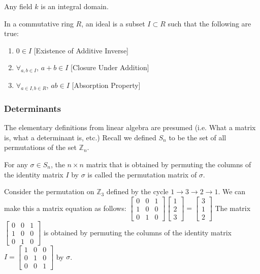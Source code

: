 \documentclass[../main.tex]{subfiles}
\begin{document}
%
\begin{theorem}
Any field $k$ is an integral domain.
\end{theorem}
%
\begin{definition}
In a commutative ring $R$, an ideal is a subset $I\subset R$ such that the following are true:
\begin{enumerate}
\item $0\in I$ \hfill [Existence of Additive Inverse]
\item $\forall_{a,b\in I}$, $a+b\in I$ \hfill [Closure Under Addition]
\item $\forall_{a\in I,b\in R}$, $a b \in I$ \hfill [Absorption Property]
\end{enumerate}
\end{definition}
%
\subsubsection{Determinants}
%
The elementary definitions from linear algebra are presumed (i.e. What a matrix is, what a determinant is, etc.) Recall we defined $S_n$ to be the set of all permutations of the set $\mathbb{Z}_n$.

\begin{definition}
For any $\sigma \in S_n$, the $n\times n$ matrix that is obtained by permuting the columns of the identity matrix $I$ by $\sigma$ is called the permutation matrix of $\sigma$.
\end{definition}

\begin{example}
Consider the permutation on $\mathbb{Z}_3$ defined by the cycle $1\rightarrow 3 \rightarrow 2 \rightarrow 1$. We can make this a matrix equation as follows: $\begin{bmatrix} 0 & 0 & 1 \\ 1 & 0 & 0 \\ 0 & 1 & 0 \end{bmatrix} \begin{bmatrix} 1 \\ 2 \\ 3 \end{bmatrix} = \begin{bmatrix} 3 \\ 1 \\ 2 \end{bmatrix}$ The matrix $\begin{bmatrix} 0 & 0 & 1 \\ 1 & 0 & 0 \\ 0 & 1 & 0 \end{bmatrix}$ is obtained by permuting the columns of the identity matrix $I = \begin{bmatrix} 1 & 0 & 0 \\ 0 & 1 & 0 \\ 0 & 0 & 1 \end{bmatrix}$ by $\sigma$.
\end{example}
\end{document}
